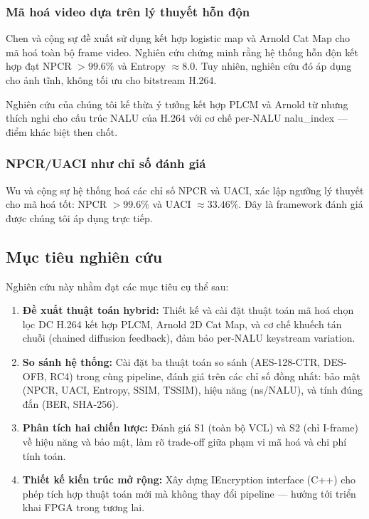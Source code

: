 \subsubsection{Mã hoá video dựa trên lý thuyết hỗn độn}

Chen và cộng sự \cite{chen_chaos_video} đề xuất sử dụng kết hợp logistic map
và Arnold Cat Map cho mã hoá toàn bộ frame video. Nghiên cứu chứng minh rằng
hệ thống hỗn độn kết hợp đạt NPCR $> 99.6\%$ và Entropy $\approx 8.0$.
Tuy nhiên, nghiên cứu đó áp dụng cho ảnh tĩnh, không tối ưu cho bitstream H.264.

Nghiên cứu của chúng tôi kế thừa ý tưởng kết hợp PLCM và Arnold từ \cite{chen_chaos_video}
nhưng thích nghi cho cấu trúc NALU của H.264 với cơ chế per-NALU nalu\_index
--- điểm khác biệt then chốt.

\subsubsection{NPCR/UACI như chỉ số đánh giá}

Wu và cộng sự \cite{wu_npcr} hệ thống hoá các chỉ số NPCR và UACI, xác lập
ngưỡng lý thuyết cho mã hoá tốt: NPCR $> 99.6\%$ và UACI $\approx 33.46\%$.
Đây là framework đánh giá được chúng tôi áp dụng trực tiếp.

\subsection{Mục tiêu nghiên cứu}

Nghiên cứu này nhằm đạt các mục tiêu cụ thể sau:

\begin{enumerate}
  \item \textbf{Đề xuất thuật toán hybrid:} Thiết kế và cài đặt thuật toán
        mã hoá chọn lọc DC H.264 kết hợp PLCM, Arnold 2D Cat Map, và
        cơ chế khuếch tán chuỗi (chained diffusion feedback), đảm bảo
        per-NALU keystream variation.

  \item \textbf{So sánh hệ thống:} Cài đặt ba thuật toán so sánh (AES-128-CTR,
        DES-OFB, RC4) trong cùng pipeline, đánh giá trên các chỉ số đồng nhất:
        bảo mật (NPCR, UACI, Entropy, SSIM, TSSIM), hiệu năng (ns/NALU), và
        tính đúng đắn (BER, SHA-256).

  \item \textbf{Phân tích hai chiến lược:} Đánh giá S1 (toàn bộ VCL) và S2
        (chỉ I-frame) về hiệu năng và bảo mật, làm rõ trade-off giữa phạm vi
        mã hoá và chi phí tính toán.

  \item \textbf{Thiết kế kiến trúc mở rộng:} Xây dựng IEncryption interface
        (C++) cho phép tích hợp thuật toán mới mà không thay đổi pipeline
        --- hướng tới triển khai FPGA trong tương lai.
\end{enumerate}

